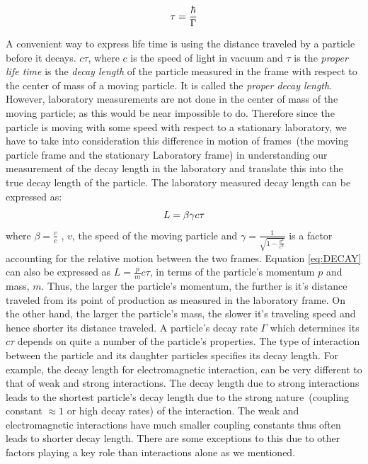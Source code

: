 \begin{equation}{\label{eq:RATE}}
  \tau = \frac{\hbar}{\Gamma}
\end{equation}

 A convenient way to express life time is using the distance traveled by a particle before it decays. $c\tau$, where $c$ is the speed of light in vacuum and $\tau$ is the \textit{proper life time} is the \textit{decay length} of the particle measured in the frame with respect to the center of mass of a moving particle. It is called the \textit{proper decay length}. However, laboratory measurements are not done in the center of mass of the moving particle; as this would be near impossible to do. Therefore since the particle is moving with some speed with respect to a stationary laboratory, we have to take into consideration this difference in motion of frames~(the moving particle frame and the stationary Laboratory frame) in understanding our measurement of the decay length in the laboratory and translate this into the true decay length of the particle. %
The laboratory measured decay length can be expressed as:
\begin{equation}{\label{eq:DECAY}}
 L = \beta \gamma c\tau
\end{equation}
where $\beta = \frac{v}{c} $ , $v$, the speed of the moving particle and $\gamma = \frac{1}{\sqrt{1 - \frac{v^{2}}{c^{2}}}}$ is a factor accounting for the relative motion between the two frames.
Equation \ref{eq:DECAY} can also be expressed as $L = \frac{p}{m}c\tau$, in terms of the particle's momentum $p$ and mass, $m$.
Thus, the larger the particle's momentum, the further is it's distance traveled from its point of production as measured in the laboratory frame. On the other hand, the larger the particle's mass, the slower it's traveling speed and hence shorter its distance traveled.
\newline
A particle's decay rate $\Gamma$ which determines its $c\tau$ depends on quite a number of the particle's properties. The type of interaction between the particle and its daughter particles specifies its decay length. For example, the decay length for electromagnetic interaction, can be very different to that of weak and strong interactions. The decay length due to strong interactions leads to the shortest particle's decay length due to the strong nature~(coupling constant $\approx 1$ or high decay rates) of the interaction. The weak and electromagnetic interactions have much smaller coupling constants thus often leads to shorter decay length. There are some exceptions to this due to other factors playing a key role than interactions alone as we mentioned.
